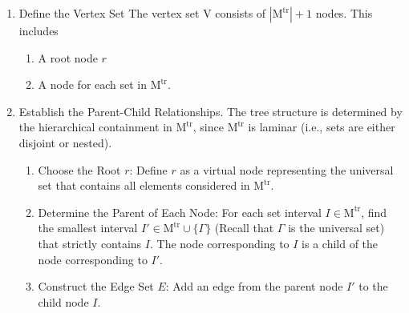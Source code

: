 \documentclass[11pt,a4paper]{article} \usepackage{enumitem}
\newcommand{\trM}{\operatorname{M^{tr}}}
\theoremstyle{definition}
\begin{document}
\begin{enumerate}
    \item Define the Vertex Set The vertex set V consists of $|\trM|+1$ nodes. This includes 
    \begin{enumerate}
        \item A root node $r$ 
        \item A node for each set in $\trM$.
    \end{enumerate}
    \item Establish the Parent-Child Relationships. The tree structure is determined by the hierarchical containment in $\trM$, since $\trM$ is laminar (i.e., sets are either disjoint or nested).
    \begin{enumerate}
    \item Choose the Root $r$: Define $r$ as a virtual node representing the universal set that contains all elements considered in $\trM$.
    \item Determine the Parent of Each Node: For each set interval $I\in \trM$, find the smallest interval $I'\in \trM\cup \lbrace \Gamma\rbrace$ (Recall that $\Gamma$ is the universal set) that strictly contains $I$. The node corresponding to $I$ is a child of the node corresponding to $I'$.
    \item Construct the Edge Set $E$: Add an edge from the parent node $I'$ to the child node $I$.
    \end{enumerate}
\end{enumerate}
\end{document}
